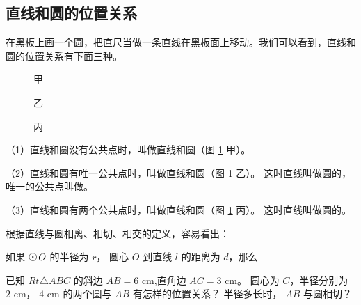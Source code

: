 \subsection{直线和圆的位置关系}\label{subsec:czjh2-7-7}

在黑板上画一个圆，把直尺当做一条直线在黑板面上移动。我们可以看到，直线和圆的位置关系有下面三种。

\begin{figure}[htbp]
    \centering
    \begin{minipage}[b]{4.5cm}
        \centering
        
        \caption*{甲}
    \end{minipage}
    \qquad
    \begin{minipage}[b]{4.5cm}
        \centering
        
        \caption*{乙}
    \end{minipage}
    \qquad
    \begin{minipage}[b]{4.5cm}
        \centering
        
        \caption*{丙}
    \end{minipage}
    \caption{}\label{fig:czjh2-7-32}
\end{figure}

（1）直线和圆没有公共点时，叫做直线和圆（图 \ref{fig:czjh2-7-32} 甲）。

（2）直线和圆有唯一公共点时，叫做直线和圆（图 \ref{fig:czjh2-7-32} 乙）。
这时直线叫做圆的，唯一的公共点叫做。

（3）直线和圆有两个公共点时，叫做直线和圆（图 \ref{fig:czjh2-7-32} 丙）。
这时直线叫做圆的。

根据直线与圆相离、相切、相交的定义，容易看出：

如果 $\yuan\,O$ 的半径为 $r$， 圆心 $O$ 到直线 $l$ 的距离为 $d$，那么






\begin{lianxi}

已知 $Rt \triangle ABC$ 的斜边 $AB = 6$ cm,直角边 $AC = 3$ cm。
圆心为 $C$，半径分别为 $2$ cm， $4$ cm 的两个圆与 $AB$ 有怎样的位置关系？
半径多长时， $AB$ 与圆相切？

\end{lianxi}

